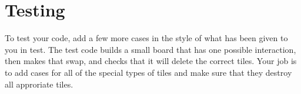 \documentclass{tufte-handout}
\begin{document}
\section{Testing}

To test your code, add a few more cases in the style of what has been given
to you in test. The test code builds a small board that has one possible
interaction, then makes that swap, and checks that it will delete the correct
tiles. Your job is to add cases for all of the special types of tiles and make
sure that they destroy all approriate tiles.
\end{document}
